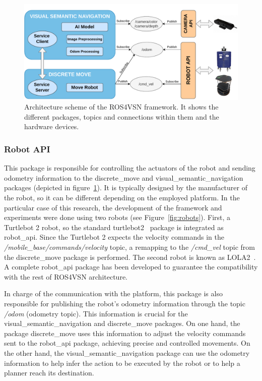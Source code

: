 \begin{figure}
    \centering
    \includegraphics[width=\linewidth]{figures/ros4vsn/arquitectura_paper}
    \caption[Architecture scheme of the ROS4VSN framework]{Architecture scheme of the ROS4VSN framework.
    It shows the different packages, topics and connections within them and the hardware devices.}
    \label{fig:arch_scheme}
\end{figure}

\subsubsection{Robot API}\label{subsubsec:robot-api2}

This package is responsible for controlling the actuators of the robot and sending odometry information to the discrete\_move and visual\_semantic\_navi\-gation packages (depicted in figure~\ref{fig:arch_scheme}).
It is typically designed by the manufacturer of the robot, so it can be different depending on the employed platform.
In the particular case of this research, the development of the framework and experiments were done using two robots (see Figure~\ref{fig:robots}).
First, a Turtlebot 2 robot, so the standard turtlebot2~\cite{kobuki} package is integrated as robot\_api.
Since the Turtlebot 2 expects the velocity commands in the \textit{/mobile\_base/commands/velocity} topic, a remapping to the \textit{/cmd\_vel} topic from the discrete\_move package is performed.
The second robot is known as LOLA2~\cite{LOLA}.
A complete robot\_api package has been developed to guarantee the compatibility with the rest of ROS4VSN architecture.

In charge of the communication with the platform, this package is also responsible for publishing the robot's odometry information through the topic \textit{/odom} (odometry topic).
This information is crucial for the visual\_seman\-tic\_navigation and discrete\_move packages.
On one hand, the package discrete\_move uses this information to adjust the velocity commands sent to the robot\_api package, achieving precise and controlled movements.
On the other hand, the visual\_semantic\_navigation package can use the odometry information to help infer the action to be executed by the robot or to help a planner reach its destination.


